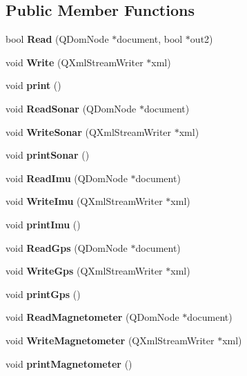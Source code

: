 \subsection*{Public Member Functions}
\begin{DoxyCompactItemize}
\item 
bool {\bfseries Read} (Q\+Dom\+Node $\ast$document, bool $\ast$out2)\label{classsensor_a0b441cdd1cc11c6bfb9c2fdb0eb6a2db}

\item 
void {\bfseries Write} (Q\+Xml\+Stream\+Writer $\ast$xml)\label{classsensor_aca5bbf179b2135c748f8879895e39a88}

\item 
void {\bfseries print} ()\label{classsensor_aca42c0495c139ca9a40ea8d788f16cae}

\item 
void {\bfseries Read\+Sonar} (Q\+Dom\+Node $\ast$document)\label{classsensor_a117074e57d6b20c34b98e391bc65b36f}

\item 
void {\bfseries Write\+Sonar} (Q\+Xml\+Stream\+Writer $\ast$xml)\label{classsensor_afc56bace48447ca4b4f8f9186b35fbd5}

\item 
void {\bfseries print\+Sonar} ()\label{classsensor_ac9e46e98ffa0abaf6afddfd9a373ffa4}

\item 
void {\bfseries Read\+Imu} (Q\+Dom\+Node $\ast$document)\label{classsensor_a7778ebf1e14c9288fabf71f7c52d4115}

\item 
void {\bfseries Write\+Imu} (Q\+Xml\+Stream\+Writer $\ast$xml)\label{classsensor_ab10773218941e656d5cfefad91a9b8c8}

\item 
void {\bfseries print\+Imu} ()\label{classsensor_a5bdf7c12dd95c0593685df02cfbbbf4c}

\item 
void {\bfseries Read\+Gps} (Q\+Dom\+Node $\ast$document)\label{classsensor_ab5bdae1f4608abc1bf9c96b4cfc702af}

\item 
void {\bfseries Write\+Gps} (Q\+Xml\+Stream\+Writer $\ast$xml)\label{classsensor_a22b50d3f2d5f059bb153afe9607e99d9}

\item 
void {\bfseries print\+Gps} ()\label{classsensor_aa421b820b3094aeb55a11261bac45ff3}

\item 
void {\bfseries Read\+Magnetometer} (Q\+Dom\+Node $\ast$document)\label{classsensor_aabf4bb64891cc3a3087fea7e84741cce}

\item 
void {\bfseries Write\+Magnetometer} (Q\+Xml\+Stream\+Writer $\ast$xml)\label{classsensor_a3e9a3745e8365198b0c162ec42325dbd}

\item 
void {\bfseries print\+Magnetometer} ()\label{classsensor_acb987c6a73997777ae538a7aad03d3eb}

\end{DoxyCompactItemize}
